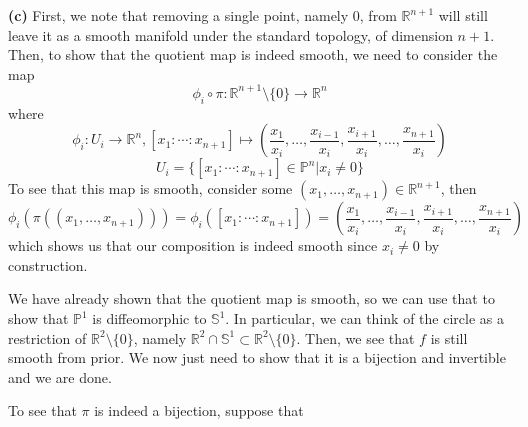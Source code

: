 \documentclass[10pt]{article}
\newcommand{\R}{\mathbb{R}}
\newcommand{\Sp}{\mathbb{S}}
\newcommand{\Pro}{\mathbb{P}}
\begin{document}
\textbf{(c)} First, we note that removing a single point, namely $0$, from $\R^{n+1}$ will still leave it as a smooth manifold under the standard topology, of dimension $n+1$. Then, to show that the quotient map is indeed smooth, we need to consider the map
$$\phi_{i} \circ \pi :\R^{n+1}\setminus \{0\} \to \R^{n}$$
where
$$\phi_{i}: U_{i} \to \R^{n}, [x_{1}:\cdots:x_{n+1}]\mapsto \left(\frac{x_{1}}{x_{i}},\dots,\frac{x_{i-1}}{x_{i}},\frac{x_{i+1}}{x_{i}},\dots,\frac{x_{n+1}}{x_{i}}\right)$$
$$U_{i} = \{[x_{1}:\cdots:x_{n+1}]\in \Pro^{n}| x_{i}\neq 0\}$$
To see that this map is smooth, consider some $(x_{1},\dots,x_{n+1})\in \R^{n+1}$, then
$$\phi_{i}\left(\pi\left((x_{1},\dots,x_{n+1})\right)\right) = \phi_{i}\left([x_{1}:\cdots:x_{n+1}]\right) = \left(\frac{x_{1}}{x_{i}},\dots,\frac{x_{i-1}}{x_{i}},\frac{x_{i+1}}{x_{i}},\dots,\frac{x_{n+1}}{x_{i}}\right)$$
which shows us that our composition is indeed smooth since $x_{i}\neq 0$ by construction.

We have already shown that the quotient map is smooth, so we can use that to show that $\Pro^{1}$ is diffeomorphic to $\Sp^{1}$. In particular, we can think of the circle as a restriction of $\R^{2}\setminus \{0\}$, namely $\R^{2}\cap \Sp^{1}\subset \R^{2}\setminus \{0\}$. Then, we see that $f$ is still smooth from prior. We now just need to show that it is a bijection and invertible and we are done.

To see that $\pi$ is indeed a bijection, suppose that 
\end{document}
